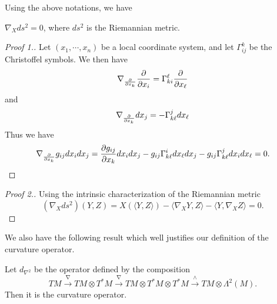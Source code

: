 Using the above notations, we have
\begin{theorem} $\nabla_X ds^2=0$, where $ds^2$ is the Riemannian metric.
\end{theorem}

\begin{proof}[Proof 1.]
Let $(x_1,\cdots,x_n)$ be a local coordinate system, and let $\Gamma_{ij}^k$ be the Christoffel symbols. 
We then have
\[
\nabla_{\frac{\partial}{\partial x_k}}\frac{\partial}{\partial x_i}=\Gamma_{ki}^\ell\frac{\partial}{\partial x_\ell}
\]
and 
\[
\nabla_{\frac{\partial}{\partial x_k}}dx_j=-\Gamma_{k\ell}^jdx_\ell
\]
Thus we have
\[
\nabla_{\frac{\partial}{\partial x_k}} g_{ij}dx_idx_j
=\frac{\partial g_{ij}}{\partial x_k}dx_idx_j-g_{ij}\Gamma_{k\ell}^i dx_\ell dx_j-g_{ij}\Gamma_{k\ell}^j dx_i dx_\ell=0.
\]

\end{proof} 

\begin{proof}[Proof 2.]Using the intrinsic 
characterization of the Riemannian metric
\[
(\nabla_X ds^2)(Y,Z)=X(\langle Y,Z\rangle)-\langle\nabla_X Y,Z\rangle-\langle Y,\nabla_X Z\rangle=0.
\]

\end{proof}

We also have the following  result which well justifies our definition of the curvature operator.

\begin{theorem}
Let $d_{\nabla^2}$ be the operator defined by the composition
\[
TM\overset{\nabla}{\longrightarrow}TM\otimes T^*M\overset{\nabla}{\longrightarrow}TM\otimes T^*M\otimes T^*M\overset{\wedge}{\longrightarrow}TM\otimes\Lambda^2(M).
\]
Then it is the curvature operator.
\end{theorem}

